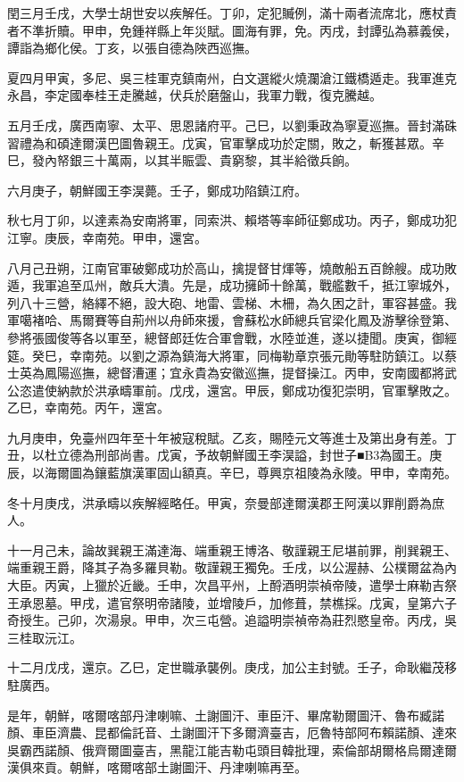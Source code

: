 \begin{pinyinscope}
閏三月壬戌，大學士胡世安以疾解任。丁卯，定犯贓例，滿十兩者流席北，應杖責者不準折贖。甲申，免鍾祥縣上年災賦。圖海有罪，免。丙戌，封譚弘為慕義侯，譚詣為鄉化侯。丁亥，以張自德為陜西巡撫。

夏四月甲寅，多尼、吳三桂軍克鎮南州，白文選縱火燒瀾滄江鐵橋遁走。我軍進克永昌，李定國奉桂王走騰越，伏兵於磨盤山，我軍力戰，復克騰越。

五月壬戌，廣西南寧、太平、思恩諸府平。己巳，以劉秉政為寧夏巡撫。晉封滿硃習禮為和碩達爾漢巴圖魯親王。戊寅，官軍擊成功於定關，敗之，斬獲甚眾。辛巳，發內帑銀三十萬兩，以其半賑雲、貴窮黎，其半給徵兵餉。

六月庚子，朝鮮國王李淏薨。壬子，鄭成功陷鎮江府。

秋七月丁卯，以達素為安南將軍，同索洪、賴塔等率師征鄭成功。丙子，鄭成功犯江寧。庚辰，幸南苑。甲申，還宮。

八月己丑朔，江南官軍破鄭成功於高山，擒提督甘煇等，燒敵船五百餘艘。成功敗遁，我軍追至瓜州，敵兵大潰。先是，成功擁師十餘萬，戰艦數千，抵江寧城外，列八十三營，絡繹不絕，設大砲、地雷、雲梯、木柵，為久困之計，軍容甚盛。我軍噶褚哈、馬爾賽等自荊州以舟師來援，會蘇松水師總兵官梁化鳳及游擊徐登第、參將張國俊等各以軍至，總督郎廷佐合軍會戰，水陸並進，遂以捷聞。庚寅，御經筵。癸巳，幸南苑。以劉之源為鎮海大將軍，同梅勒章京張元勛等駐防鎮江。以蔡士英為鳳陽巡撫，總督漕運；宜永貴為安徽巡撫，提督操江。丙申，安南國都將武公恣遣使納款於洪承疇軍前。戊戌，還宮。甲辰，鄭成功復犯崇明，官軍擊敗之。乙巳，幸南苑。丙午，還宮。

九月庚申，免臺州四年至十年被寇稅賦。乙亥，賜陸元文等進士及第出身有差。丁丑，以杜立德為刑部尚書。戊寅，予故朝鮮國王李淏謚，封世子■B3為國王。庚辰，以海爾圖為鑲藍旗漢軍固山額真。辛巳，尊興京祖陵為永陵。甲申，幸南苑。

冬十月庚戌，洪承疇以疾解經略任。甲寅，奈曼部達爾漢郡王阿漢以罪削爵為庶人。

十一月己未，論故巽親王滿達海、端重親王博洛、敬謹親王尼堪前罪，削巽親王、端重親王爵，降其子為多羅貝勒。敬謹親王獨免。壬戌，以公渥赫、公樸爾盆為內大臣。丙寅，上獵於近畿。壬申，次昌平州，上酹酒明崇禎帝陵，遣學士麻勒吉祭王承恩墓。甲戌，遣官祭明帝諸陵，並增陵戶，加修葺，禁樵採。戊寅，皇第六子奇授生。己卯，次湯泉。甲申，次三屯營。追謚明崇禎帝為莊烈愍皇帝。丙戌，吳三桂取沅江。

十二月戊戌，還京。乙巳，定世職承襲例。庚戌，加公主封號。壬子，命耿繼茂移駐廣西。

是年，朝鮮，喀爾喀部丹津喇嘛、土謝圖汗、車臣汗、畢席勒爾圖汗、魯布臧諾顏、車臣濟農、昆都倫託音、土謝圖汗下多爾濟臺吉，厄魯特部阿布賴諾顏、達來吳霸西諾顏、俄齊爾圖臺吉，黑龍江能吉勒屯頭目韓批理，索倫部胡爾格烏爾達爾漢俱來貢。朝鮮，喀爾喀部土謝圖汗、丹津喇嘛再至。


\end{pinyinscope}
